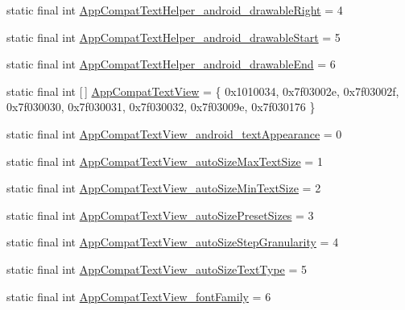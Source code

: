 \begin{DoxyCompactItemize}
\item 
static final int \mbox{\hyperlink{classandroid_1_1support_1_1design_1_1_r_1_1styleable_a40dc16e17c8a3cdee08c9ef5170fec23}{App\+Compat\+Text\+Helper\+\_\+android\+\_\+drawable\+Right}} = 4
\item 
static final int \mbox{\hyperlink{classandroid_1_1support_1_1design_1_1_r_1_1styleable_a58f154421ba8b61d7cc28a7f4387e2de}{App\+Compat\+Text\+Helper\+\_\+android\+\_\+drawable\+Start}} = 5
\item 
static final int \mbox{\hyperlink{classandroid_1_1support_1_1design_1_1_r_1_1styleable_afd1efc9eb3776bd11b7615bbec9961b6}{App\+Compat\+Text\+Helper\+\_\+android\+\_\+drawable\+End}} = 6
\item 
static final int \mbox{[}$\,$\mbox{]} \mbox{\hyperlink{classandroid_1_1support_1_1design_1_1_r_1_1styleable_a4f8449fe92fa53cd1fd4547247fe52b6}{App\+Compat\+Text\+View}} = \{ 0x1010034, 0x7f03002e, 0x7f03002f, 0x7f030030, 0x7f030031, 0x7f030032, 0x7f03009e, 0x7f030176 \}
\item 
static final int \mbox{\hyperlink{classandroid_1_1support_1_1design_1_1_r_1_1styleable_a209c032caa80f4c43d72cadddbe05ec2}{App\+Compat\+Text\+View\+\_\+android\+\_\+text\+Appearance}} = 0
\item 
static final int \mbox{\hyperlink{classandroid_1_1support_1_1design_1_1_r_1_1styleable_a53ae6fee67748ea9696e40327152e5a1}{App\+Compat\+Text\+View\+\_\+auto\+Size\+Max\+Text\+Size}} = 1
\item 
static final int \mbox{\hyperlink{classandroid_1_1support_1_1design_1_1_r_1_1styleable_a89f29ea374b0c74e130833c33e7713d8}{App\+Compat\+Text\+View\+\_\+auto\+Size\+Min\+Text\+Size}} = 2
\item 
static final int \mbox{\hyperlink{classandroid_1_1support_1_1design_1_1_r_1_1styleable_abf22bc31dc9b4273a1bebcad1658f3b6}{App\+Compat\+Text\+View\+\_\+auto\+Size\+Preset\+Sizes}} = 3
\item 
static final int \mbox{\hyperlink{classandroid_1_1support_1_1design_1_1_r_1_1styleable_ac102a860e6dd2e6d051bf54c08c86f1d}{App\+Compat\+Text\+View\+\_\+auto\+Size\+Step\+Granularity}} = 4
\item 
static final int \mbox{\hyperlink{classandroid_1_1support_1_1design_1_1_r_1_1styleable_a8ff9113264a34d65ef2323bb7549c510}{App\+Compat\+Text\+View\+\_\+auto\+Size\+Text\+Type}} = 5
\item 
static final int \mbox{\hyperlink{classandroid_1_1support_1_1design_1_1_r_1_1styleable_a365ca916405d107594c65faf23d7c4f1}{App\+Compat\+Text\+View\+\_\+font\+Family}} = 6

\end{DoxyCompactItemize}

